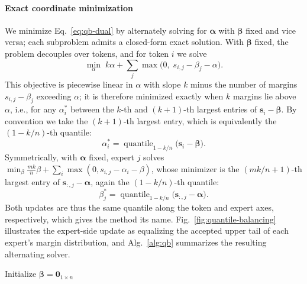 \paragraph{Exact coordinate minimization}
We minimize Eq.~\ref{eq:qb-dual} by alternately solving for $\bm{\alpha}$ with $\bm{\beta}$ fixed and vice versa; each subproblem admits a closed-form exact solution.
With $\bm{\beta}$ fixed, the problem decouples over tokens, and for token $i$ we solve
\begin{equation}
    \min_{\alpha}\; k\alpha + \sum_{j}\max\big(0,\; s_{i,j} - \beta_j - \alpha\big).
    \label{eq:qb-alpha-sub}
\end{equation}
This objective is piecewise linear in $\alpha$ with slope $k$ minus the number of margins $s_{i,j}-\beta_j$ exceeding $\alpha$; it is therefore minimized exactly when $k$ margins lie above $\alpha$, i.e., for any $\alpha_i^*$ between the $k$-th and $(k{+}1)$-th largest entries of $\bm{s}_i-\bm{\beta}$.
By convention we take the $(k{+}1)$-th largest entry, which is equivalently the $(1-k/n)$-th quantile:
\begin{equation}
    \alpha_i^*
    = \operatorname{quantile}_{1-k/n}\big(\bm{s}_i - \bm{\beta}\big).
    \label{eq:qb-alpha-sol}
\end{equation}
Symmetrically, with $\bm{\alpha}$ fixed, expert $j$ solves $\min_{\beta}\frac{mk}{n}\beta + \sum_i \max(0, s_{i,j}-\alpha_i-\beta)$, whose minimizer is the $(mk/n{+}1)$-th largest entry of $\bm{s}_{:,j}-\bm{\alpha}$, again the $(1-k/n)$-th quantile:
\begin{equation}
    \beta_j^*
    = \operatorname{quantile}_{1-k/n}\big(\bm{s}_{:,j} - \bm{\alpha}\big).
    \label{eq:qb-beta-sol}
\end{equation}
Both updates are thus the same quantile along the token and expert axes, respectively, which gives the method its name.
Fig.~\ref{fig:quantile-balancing} illustrates the expert-side update as equalizing the accepted upper tail of each expert's margin distribution, and Alg.~\ref{alg:qb} summarizes the resulting alternating solver.

\begin{algorithm}[t]
    \caption{The alternating QB solver.\label{alg:qb}}
    Initialize $\bm{\beta} = \bm{0}_{1\times n}$\;\DontPrintSemicolon
\end{algorithm}


